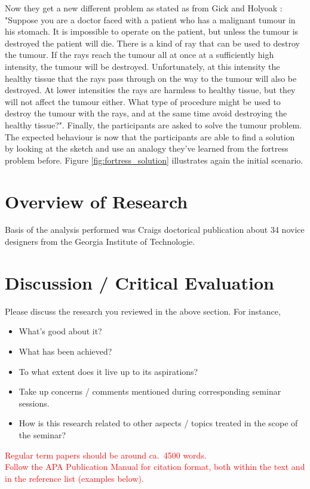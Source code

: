 \documentclass[12pt]{article}
\begin{document}
Now they get a new different problem as stated as from Gick and Holyoak \cite[307-308]{gick1980analogical}: "Suppose you are a doctor faced with a patient who has a malignant tumour in his stomach. It is impossible to operate on the patient, but unless the tumour is destroyed the patient will die. There is a kind of ray that can be used to destroy the tumour. If  the rays reach the tumour all at once at a sufficiently high intensity, the tumour will be destroyed. Unfortunately, at this intensity the healthy tissue that the rays pass through on the way to the tumour will also be destroyed. At lower intensities the rays are harmless to healthy tissue, but they will not affect the tumour either. What type of procedure might be used to destroy the tumour with the rays, and at the same time avoid destroying the healthy tissue?". Finally, the participants are asked to solve the tumour problem. The expected behaviour is now that the participants are able to find a solution by looking at the sketch and use an analogy they've learned from the fortress problem before. Figure \ref{fig:fortress_solution} illustrates again the initial scenario.

\section{Overview of Research}
Basis of the analysis performed was Craigs \cite{craig2003perceptual} doctorical publication about 34 novice designers from the Georgia Institute of Technologie.


\section{Discussion / Critical Evaluation}
Please discuss the research you reviewed in the above section. For instance,
\begin{itemize}
\item What's good about it?
\item What has been achieved?
\item To what extent does it live up to its aspirations?
\item Take up concerns / comments mentioned during corresponding seminar sessions.
\item How is this research related to other aspects / topics treated in the scope of the seminar?
\end{itemize}

\noindent
\textcolor{red}{Regular term papers should be around  ca.\ 4500 words. \\[2mm] Follow the APA Publication Manual for citation format, both within the text and in the reference list (examples below).}

\nocite{allen:99,allport:94,cranach:80}




\end{document}
